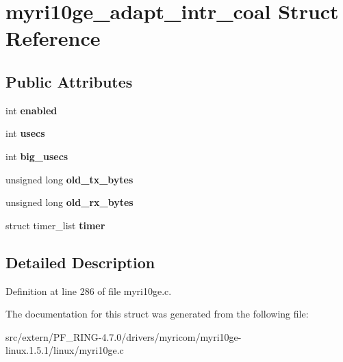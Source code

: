 \hypertarget{structmyri10ge__adapt__intr__coal}{
\section{myri10ge\_\-adapt\_\-intr\_\-coal Struct Reference}
\label{structmyri10ge__adapt__intr__coal}
}
\subsection*{Public Attributes}
\begin{DoxyCompactItemize}
\item 
\hypertarget{structmyri10ge__adapt__intr__coal_aac4b8aae4a306448d1bcac5e50743bc8}{
int {\bfseries enabled}}
\label{structmyri10ge__adapt__intr__coal_aac4b8aae4a306448d1bcac5e50743bc8}

\item 
\hypertarget{structmyri10ge__adapt__intr__coal_a899ce5e85447242a24d092bef0a88959}{
int {\bfseries usecs}}
\label{structmyri10ge__adapt__intr__coal_a899ce5e85447242a24d092bef0a88959}

\item 
\hypertarget{structmyri10ge__adapt__intr__coal_aa6e364aeab772add64f51d43235f4d18}{
int {\bfseries big\_\-usecs}}
\label{structmyri10ge__adapt__intr__coal_aa6e364aeab772add64f51d43235f4d18}

\item 
\hypertarget{structmyri10ge__adapt__intr__coal_ae7a64e229ef344c1c752c0a4ae2a1cbf}{
unsigned long {\bfseries old\_\-tx\_\-bytes}}
\label{structmyri10ge__adapt__intr__coal_ae7a64e229ef344c1c752c0a4ae2a1cbf}

\item 
\hypertarget{structmyri10ge__adapt__intr__coal_a900f1d23c5e9baa75073f36e4e5ac5dd}{
unsigned long {\bfseries old\_\-rx\_\-bytes}}
\label{structmyri10ge__adapt__intr__coal_a900f1d23c5e9baa75073f36e4e5ac5dd}

\item 
\hypertarget{structmyri10ge__adapt__intr__coal_a92fee028595bf9472c56492584bbef16}{
struct timer\_\-list {\bfseries timer}}
\label{structmyri10ge__adapt__intr__coal_a92fee028595bf9472c56492584bbef16}

\end{DoxyCompactItemize}


\subsection{Detailed Description}


Definition at line 286 of file myri10ge.c.



The documentation for this struct was generated from the following file:\begin{DoxyCompactItemize}
\item 
src/extern/PF\_\-RING-\/4.7.0/drivers/myricom/myri10ge-\/linux.1.5.1/linux/myri10ge.c\end{DoxyCompactItemize}
